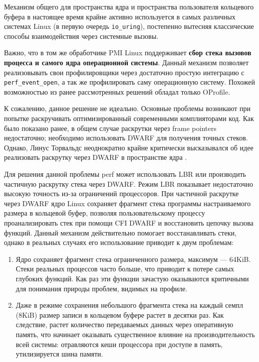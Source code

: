 Механизм общего для пространства ядра и пространства пользователя кольцевого буфера в настоящее время крайне активно используется
в самых различных системах Linux (в первую очередь \lstinline!io_uring!),
постепенно вытесняя классические способы взаимодействия через системные вызовы.

Важно, что в том же обработчике PMI Linux поддерживает \textbf{сбор стека вызовов процесса и самого ядра операционной системы}.
Данный механизм позволяет реализовывать свои профилировщики через достаточно простую интеграцию с \verb!perf_event_open!,
а так же профилировать саму операционную систему. Похожей возможностью из ранее рассмотренных решений обладал только OProfile.

К сожалению, данное решение не идеально.
Основные проблемы возникают при попытке раскручивать оптимизированный современными комплияторами код.
Как было показано ранее, в общем случае раскрутки через frame pointers недостаточно;
необходимо использовать DWARF для получения точных стеков.
Однако, Линус Торвальдс неоднократно крайне критически высказывался об идее реализовать
раскрутку через DWARF в пространстве ядра \cite{dwarf:linus}.

Для решения данной проблемы perf может использовать LBR или производить частичную раскрутку стека через DWARF.
Режим LBR показывает недостаточно высокую точность из-за ограничений процессоров.
При частичной раскрутке через DWARF ядро Linux сохраняет фрагмент стека программы настраиваемого размера в кольцевой буфер,
позволяя пользовательскому процессу проанализировать стек при помощи CFI DWARF и восстановить цепочку вызова функций.
Данный механизм действительно помогает восстанавливать стеки, однако в реальных случаях его использование приводит к двум проблемам:
\begin{enumerate}
    \item
        Ядро сохраняет фрагмент стека ограниченного размера, максимум --- 64KiB.
        Стеки реальных процессов часто больше, что приводит к потере самых глубоких функций.
        Как раз эти функции зачастую оказываются критичными для понимания природы проблем, видимых на профиле.
    \item
        Даже в режиме сохранения небольшого фрагмента стека на каждый семпл (8KiB) размер записи в кольцевом буфере растет в десятки раз.
        Как следствие, растет количество передаваемых данных через оперативную память, что начинает оказывать существенное влияние на
        производительность всей системы: отравляются кеши процессора при доступе в память, утилизируется шина памяти.
\end{enumerate}

